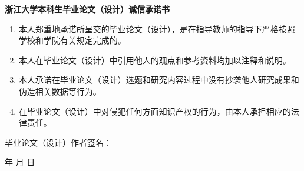 
\newpage
\thispagestyle{empty}

\begin{center}
\heiti\xiaosan \textbf{浙江大学本科生毕业论文（设计）诚信承诺书}
\end{center}

\vspace{5mm}

{\songti\sihao
\begin{enumerate}
  \item 本人郑重地承诺所呈交的毕业论文（设计），是在指导教师的指导下严格按照学校和学院有关规定完成的。
  \item 本人在毕业论文（设计）中引用他人的观点和参考资料均加以注释和说明。
  \item 本人承诺在毕业论文（设计）选题和研究内容过程中没有抄袭他人研究成果和伪造相关数据等行为。
  \item 在毕业论文（设计）中对侵犯任何方面知识产权的行为，由本人承担相应的法律责任。
\end{enumerate}

\vspace{12mm}
\hspace{20mm}毕业论文（设计）作者签名：
\begin{flushright}
    \underline{\hspace{4em}} 年 \underline{\hspace{2em}} 月 \underline{\hspace{2em}} 日
\end{flushright}}

